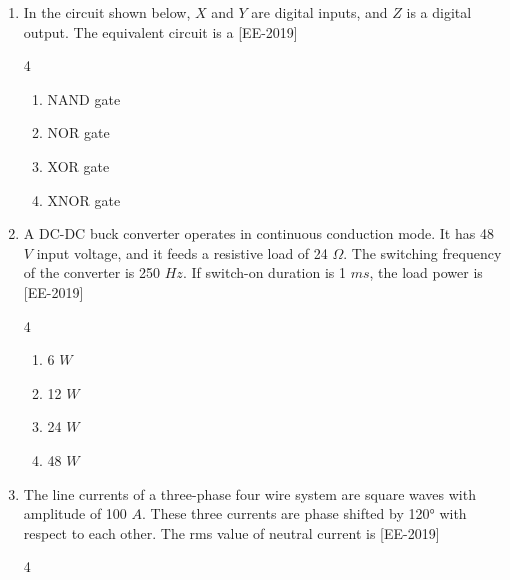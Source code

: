 \documentclass[journal]{IEEEtran}
\begin{document}
\begin{enumerate}
\begin{multicols}{2}
    \begin{enumerate}
        \item $\overline{Q}R + S$
        \item $Q\overline{R} + \overline{S}$
        \item $QR + S$
        \item $QR + \overline{S}$
    \end{enumerate}
    \end{multicols}
    \item In the circuit shown below, $X$ and $Y$ are digital inputs, and $Z$ is a digital output. The equivalent circuit is a \hfill{[EE-2019]}
    \begin{figure}[H]
\centering
    
    \end{figure}
    \begin{multicols}{4}
        
    
    \begin{enumerate}
        \item NAND gate
        \item NOR gate
        \item XOR gate
        \item XNOR gate
    \end{enumerate}
    \end{multicols}
    \item A DC-DC buck converter operates in continuous conduction mode. It has 48 $V$ input voltage, and it feeds a resistive load of 24 $\Omega$. The switching frequency of the converter is 250 $Hz$. If switch-on duration is 1 $ms$, the load power is \hfill{[EE-2019]}
    \begin{multicols}{4}
        
    
    \begin{enumerate}
        \item 6 $W$
        \item 12 $W$
        \item 24 $W$
        \item 48 $W$
    \end{enumerate}
    \end{multicols}
    \item The line currents of a three-phase four wire system are square waves with amplitude of 100 $A$. These three currents are phase shifted by 120° with respect to each other. The rms value of neutral current is \hfill{[EE-2019]}
    \begin{multicols}{4}
        

\end{multicols}
\end{enumerate}
\end{document}

